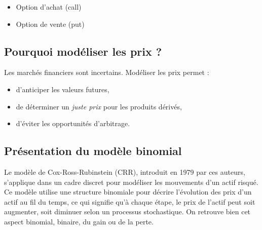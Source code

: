 \documentclass[12pt,a4paper]{article}
\begin{document}
\begin{itemize}
  \item Option d'achat (call)
  \item Option de vente (put)
\end{itemize}

\subsection{Pourquoi modéliser les prix ?}
Les marchés financiers sont incertains. Modéliser les prix permet :
\begin{itemize}
  \item d'anticiper les valeurs futures,
  \item de déterminer un \textit{juste prix} pour les produits dérivés,
  \item d'éviter les opportunités d'arbitrage.
\end{itemize}

\subsection{Présentation du modèle binomial}
Le modèle de Cox-Ross-Rubinstein (CRR), introduit en 1979 par ces auteurs, s'applique dans un cadre discret pour modéliser les mouvements d'un actif risqué. Ce modèle utilise une structure binomiale pour décrire l'évolution des prix d'un actif au fil du temps, ce qui signifie qu'à chaque étape, le prix de l'actif peut soit augmenter, soit diminuer selon un processus stochastique. On retrouve bien cet aspect binomial, binaire, du gain ou de la perte.

\begin{center}
\end{center}
\end{document}
